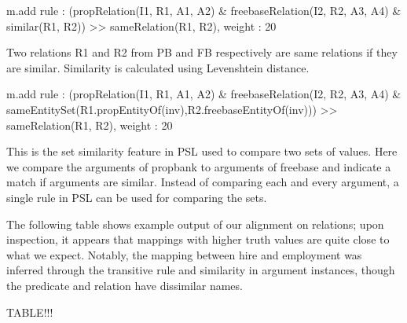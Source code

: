 m.add rule : (propRelation(I1, R1, A1, A2) \& freebaseRelation(I2, R2, A3, A4) \& similar(R1, R2)) >> sameRelation(R1, R2), weight : 20

Two relations R1 and R2 from PB and FB respectively are same relations if they are similar. Similarity is calculated using Levenshtein distance.

m.add rule : (propRelation(I1, R1, A1, A2) \& freebaseRelation(I2, R2, A3, A4) \& sameEntitySet({R1.propEntityOf(inv)},{R2.freebaseEntityOf(inv)})) >> sameRelation(R1, R2),  weight : 20

This is the set similarity feature in PSL used to compare two sets of values. Here we compare the arguments of propbank to arguments of freebase and indicate a match if arguments are similar. Instead of comparing each and every argument, a single rule in PSL can be used for comparing the sets.

The following table shows example output of our alignment on relations; upon inspection, it appears that mappings with higher truth values are quite close to what we expect.  Notably, the mapping between hire and employment was inferred through the transitive rule and similarity in argument instances, though the predicate and relation have dissimilar names.

TABLE!!!



